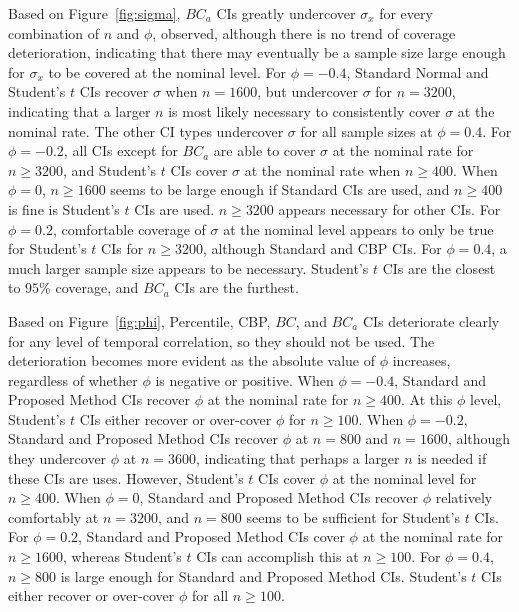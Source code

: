 \documentclass[12pt, letterpaper, titlepage]{article}
\begin{document}
Based on Figure~\ref{fig:sigma}, 
$BC_a$ CIs greatly undercover $\sigma_x$ for every combination of $n$ and 
$\phi$, observed, although
there is no trend of coverage deterioration, indicating that there may eventually
be a sample size large enough for $\sigma_x$ to be covered at the nominal level.
For $\phi = -0.4$, Standard Normal and Student's $t$ CIs recover $\sigma$ when 
$n = 1600$, but undercover $\sigma$ for $n = 3200$, indicating
that a larger $n$ is most likely necessary to consistently cover $\sigma$ at the 
nominal rate.
The other CI types undercover $\sigma$ for all sample sizes at $\phi = 0.4$.
For $\phi  = -0.2$, all CIs except for $BC_a$ are able to cover $\sigma$ at the 
nominal rate for $n \geq 3200$, and Student's $t$ CIs cover $\sigma$ at the 
nominal rate when $n \geq 400$. When $\phi = 0$, $n \geq 1600$ seems to 
be large enough if Standard CIs are used, and $n \geq 400$ is fine is
Student's $t$ CIs are used. $n \geq 3200$ appears necessary 
for other CIs. For $\phi = 0.2$, 
comfortable coverage of $\sigma$ at the nominal level appears to only be true
for Student's $t$ CIs for $n \geq 3200$, although Standard and CBP CIs. For $\phi = 0.4$, a much larger sample size appears to be necessary. Student's $t$ CIs are the closest to $95\%$ coverage, and $BC_a$ CIs are the furthest.

Based on Figure~\ref{fig:phi}, 
Percentile, CBP, $BC$, and $BC_a$ CIs deteriorate clearly for any level of temporal correlation,
so they should not be used. The deterioration becomes more evident
as the absolute value of $\phi$ increases, regardless of whether $\phi$ is 
negative or positive. When $\phi = -0.4$, Standard and Proposed Method CIs 
recover $\phi$ at the nominal rate for $n \geq 400$. At this $\phi$ level,
Student's $t$ CIs either recover or over-cover $\phi$ for $n \geq 100$. When
$\phi = -0.2$, Standard and Proposed Method CIs recover $\phi$ at $n = 800$ and 
$n = 1600$, 
although they undercover $\phi$ at $n = 3600$, indicating that 
perhaps a larger $n$ is needed if these CIs are uses. However,
Student's $t$ CIs cover $\phi$ at the nominal level for $n \geq 400$. When
$\phi = 0$, Standard and Proposed Method CIs recover $\phi$ relatively comfortably 
at $n = 3200$, and 
$n = 800$ seems to be sufficient for Student's $t$ CIs. For $\phi = 0.2$, Standard
and Proposed Method CIs cover $\phi$ at the nominal rate for $n \geq 1600$, whereas 
Student's $t$ CIs can accomplish this at $n \geq 100$. For $\phi = 0.4$, $n \geq 
800$ is large enough for Standard and Proposed Method CIs. Student's $t$ CIs either
recover or over-cover $\phi$ for all $n \geq 100$.
\end{document}
